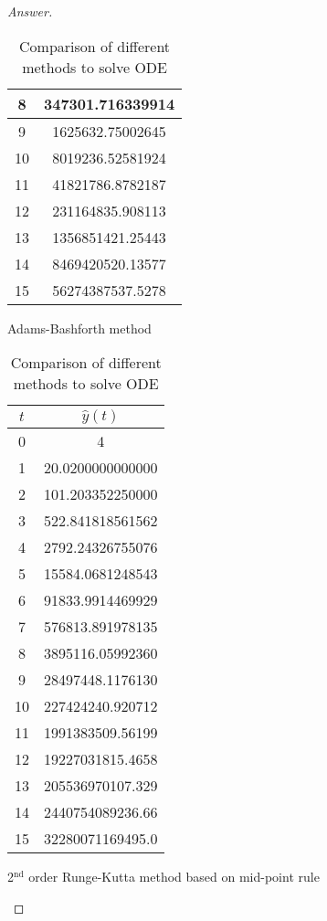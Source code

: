 \begin{proof}[Answer]
\begin{table}[H]
\begin{table}[htbp]
\begin{subtable}[t]{0.32\textwidth}
\begin{tabular}[t]{|c|c|}
		8	&	347301.716339914	\\	\hline
		9	&	1625632.75002645	\\	\hline
		10	&	8019236.52581924	\\	\hline
		11	&	41821786.8782187	\\	\hline
		12	&	231164835.908113	\\	\hline
		13	&	1356851421.25443	\\	\hline
		14	&	8469420520.13577	\\	\hline
		15	&	56274387537.5278	\\	\hline
		\end{tabular}
		\caption{Adams-Bashforth method}
	\end{subtable}
	\begin{subtable}[t]{0.32\textwidth}
		\centering
		\begin{tabular}[t]{|c|c|}
		\hline
		\(t\)	&	\(\hat{y}(t)\)	\\	\hline
		0	&	4					\\	\hline
		1	&	20.0200000000000	\\	\hline
		2	&	101.203352250000	\\	\hline
		3	&	522.841818561562	\\	\hline
		4	&	2792.24326755076	\\	\hline
		5	&	15584.0681248543	\\	\hline
		6	&	91833.9914469929	\\	\hline
		7	&	576813.891978135	\\	\hline
		8	&	3895116.05992360	\\	\hline
		9	&	28497448.1176130	\\	\hline
		10	&	227424240.920712	\\	\hline
		11	&	1991383509.56199	\\	\hline
		12	&	19227031815.4658	\\	\hline
		13	&	205536970107.329	\\	\hline
		14	&	2440754089236.66	\\	\hline
		15	&	32280071169495.0	\\	\hline
		\end{tabular}
		\caption{2\(^\text{nd}\) order Runge-Kutta method based on mid-point rule}
	\end{subtable}

	\caption{Comparison of different methods to solve ODE}
	\label{odecomparisontab}
\end{table}



\end{table}
\end{proof}
